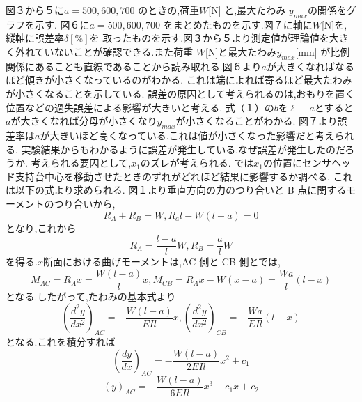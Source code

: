 \documentclass[a4paper,11pt]{jsarticle}
\begin{document}
\begin{enumerate}
        \quad 図３から５に$a = 500,600,700$ のときの,荷重$ W $[N] と,最大たわみ $y_{max}$の関係をグラフを示す.
        図６に$a = 500,600,700$ をまとめたものを示す.図７に軸に$ W$[N]を,縦軸に誤差率$ \delta [\%]$を
        取ったものを示す.図３から５より測定値が理論値を大きく外れていないことが確認できる.また荷重 $W $[N]と最大たわみ$ y_{max}$[mm]
        が比例関係にあることも直線であることから読み取れる.図６より$a$が大きくなればなるほど傾きが小さくなっているのがわかる.
        これは端によれば寄るほど最大たわみが小さくなることを示している.
        誤差の原因として考えられるのは,おもりを置く位置などの過失誤差による影響が大きいと考える.
        式（１）の$b$を$\ell-a$とすると$a$が大きくなれば分母が小さくなり$y_{max}$が小さくなることがわかる.
        図７より誤差率は$a$が大きいほど高くなっている.これは値が小さくなった影響だと考えられる.
        実験結果からもわかるように誤差が発生している.なぜ誤差が発生したのだろうか.
        考えられる要因として,$x_1$のズレが考えられる.
        では$x_1$の位置にセンサヘッド支持台中心を移動させたときのずれがどれほど結果に影響するか調べる.
        これは以下の式より求められる.
        図１より垂直方向の力のつり合いと B 点に関するモーメントのつり合いから,
        \begin{equation}
          R_A+R_B=W,R_al-W(l-a)=0
        \end{equation}
        となり,これから
        \begin{equation}
          R_A={\dfrac{l-a}{l}W},R_B={\dfrac{a}{l}W}
        \end{equation}
        を得る.$x$断面における曲げモーメントは,AC 側と CB 側とでは,
        \begin{equation}
          M_{AC}=R_Ax={\dfrac{W(l-a)}{l}x},M_{CB}=R_Ax-W(x-a)={\dfrac{Wa}{l}(l-x)}
        \end{equation}
        となる.したがって,たわみの基本式より
        \begin{equation}
          {(\dfrac{d^2y}{dx^2})_{AC}}={-\dfrac{W(l-a)}{EIl}x},
          {(\dfrac{d^2y}{dx^2})_{CB}}={-\dfrac{Wa}{EIl}(l-x)}
        \end{equation}
        となる.これを積分すれば
        \begin{equation}
          {(\dfrac{dy}{dx})_{AC}}={-\dfrac{W(l-a)}{2EIl}x^2+c_1}
        \end{equation}
        \begin{equation}
          {(y)_{AC}}={-\dfrac{W(l-a)}{6EIl}x^3+c_1x+c_2}
        \end{equation}
        \begin{equation}

\end{equation}
\end{enumerate}
\end{document}
